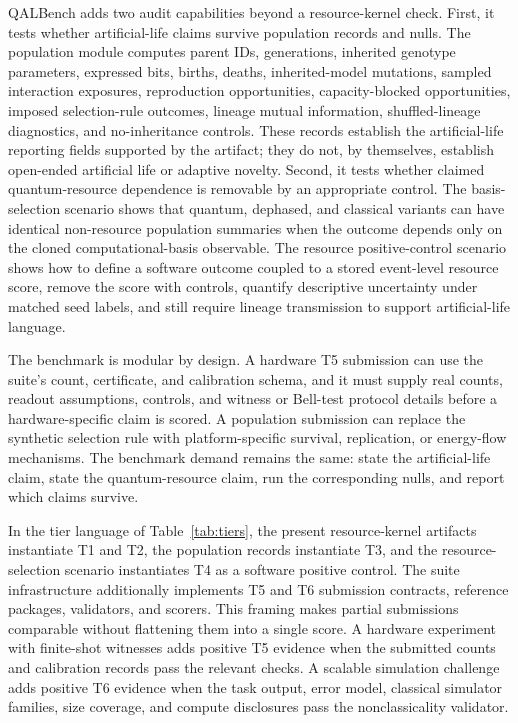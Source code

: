\documentclass[11pt]{article}
\begin{document}
QALBench adds two audit capabilities beyond a resource-kernel check. First, it tests whether artificial-life claims survive population records and nulls. The population module computes parent IDs, generations, inherited genotype parameters, expressed bits, births, deaths, inherited-model mutations, sampled interaction exposures, reproduction opportunities, capacity-blocked opportunities, imposed selection-rule outcomes, lineage mutual information, shuffled-lineage diagnostics, and no-inheritance controls. These records establish the artificial-life reporting fields supported by the artifact; they do not, by themselves, establish open-ended artificial life or adaptive novelty. Second, it tests whether claimed quantum-resource dependence is removable by an appropriate control. The basis-selection scenario shows that quantum, dephased, and classical variants can have identical non-resource population summaries when the outcome depends only on the cloned computational-basis observable. The resource positive-control scenario shows how to define a software outcome coupled to a stored event-level resource score, remove the score with controls, quantify descriptive uncertainty under matched seed labels, and still require lineage transmission to support artificial-life language.

The benchmark is modular by design. A hardware T5 submission can use the suite's count, certificate, and calibration schema, and it must supply real counts, readout assumptions, controls, and witness or Bell-test protocol details before a hardware-specific claim is scored. A population submission can replace the synthetic selection rule with platform-specific survival, replication, or energy-flow mechanisms. The benchmark demand remains the same: state the artificial-life claim, state the quantum-resource claim, run the corresponding nulls, and report which claims survive.

In the tier language of Table~\ref{tab:tiers}, the present resource-kernel artifacts instantiate T1 and T2, the population records instantiate T3, and the resource-selection scenario instantiates T4 as a software positive control. The suite infrastructure additionally implements T5 and T6 submission contracts, reference packages, validators, and scorers. This framing makes partial submissions comparable without flattening them into a single score. A hardware experiment with finite-shot witnesses adds positive T5 evidence when the submitted counts and calibration records pass the relevant checks. A scalable simulation challenge adds positive T6 evidence when the task output, error model, classical simulator families, size coverage, and compute disclosures pass the nonclassicality validator.
\end{document}

